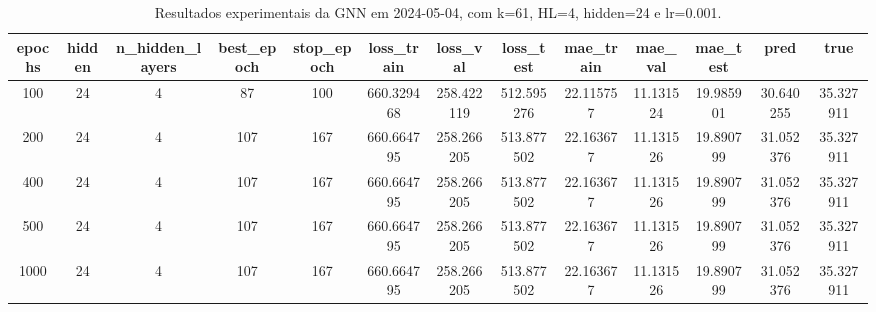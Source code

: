 \begin{table}[h]
\centering
\caption{Resultados experimentais da GNN em 2024-05-04, com k=61, HL=4, hidden=24 e lr=0.001.}
\label{tab:gnn_results_k61_hl4_h24_d20240504}
\begin{tabular}{ccccccccccccc}
\toprule
epochs & hidden & n\_hidden\_layers & best\_epoch & stop\_epoch & loss\_train & loss\_val & loss\_test & mae\_train & mae\_val & mae\_test & pred & true \\
\midrule
100 & 24 & 4 & 87 & 100 & 660.329468 & 258.422119 & 512.595276 & 22.115757 & 11.131524 & 19.985901 & 30.640255 & 35.327911 \\
200 & 24 & 4 & 107 & 167 & 660.664795 & 258.266205 & 513.877502 & 22.163677 & 11.131526 & 19.890799 & 31.052376 & 35.327911 \\
400 & 24 & 4 & 107 & 167 & 660.664795 & 258.266205 & 513.877502 & 22.163677 & 11.131526 & 19.890799 & 31.052376 & 35.327911 \\
500 & 24 & 4 & 107 & 167 & 660.664795 & 258.266205 & 513.877502 & 22.163677 & 11.131526 & 19.890799 & 31.052376 & 35.327911 \\
1000 & 24 & 4 & 107 & 167 & 660.664795 & 258.266205 & 513.877502 & 22.163677 & 11.131526 & 19.890799 & 31.052376 & 35.327911 \\
\bottomrule
\end{tabular}
\end{table}
